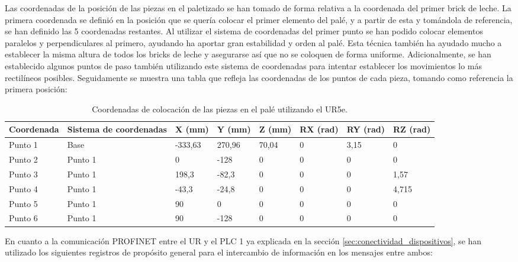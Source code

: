Las coordenadas de la posición de las piezas en el paletizado se han tomado de forma relativa a la coordenada del primer brick de leche. La primera coordenada se definió en la posición que se quería colocar el primer elemento del palé, y a partir de esta y tomándola de referencia, se han definido las 5 coordenadas restantes. Al utilizar el sistema de coordenadas del primer punto se han podido colocar elementos paralelos y perpendiculares al primero, ayudando ha aportar gran estabilidad y orden al palé. Esta técnica también ha ayudado mucho a establecer la misma altura de todos los bricks de leche y asegurarse así que no se coloquen de forma uniforme. Adicionalmente, se han establecido algunos puntos de paso también utilizando este sistema de coordenadas para intentar establecer los movimientos lo más rectilíneos posibles. Seguidamente se muestra una tabla que refleja las coordenadas de los puntos de cada pieza, tomando como referencia la primera posición:

\begin{table}[H]
\begin{center}

\renewcommand{\arraystretch}{1.5}
\begin{tabular}{|M{2.45cm}|M{2.7cm}|M{1.35cm}|M{1.35cm}|M{1.35cm}|M{1.2cm}|M{1.2cm}|M{1.2cm}|}
\hline
\textbf{Coordenada} &
\textbf{Sistema de coordenadas} & 
\textbf{X (mm)} & 
\textbf{Y (mm)} & 
\textbf{Z (mm)} &
\textbf{RX (rad)} &
\textbf{RY (rad)} &
\textbf{RZ (rad)} \\
\hline
Punto 1  & Base &  -333,63 & 270,96 & 70,04 & 0 & 3,15 & 0 \\
\hline
Punto 2  & Punto 1 &  0 & -128 & 0 & 0 & 0 & 0 \\
\hline
Punto 3  & Punto 1 &  198,3 & -82,3 & 0 & 0 & 0 & 1,57 \\
\hline
Punto 4  & Punto 1 &  -43,3 & -24,8 & 0 & 0 & 0 & 4,715 \\
\hline
Punto 5  & Punto 1 &  90 & 0 & 0 & 0 & 0 & 0 \\
\hline
Punto 6  & Punto 1 &  90 & -128 & 0 & 0 & 0 & 0 \\
\hline
\end{tabular}

\caption{\centering Coordenadas de colocación de las piezas en el palé utilizando el UR5e.}
\label{cuadro:coordenadas}
\end{center}
\end{table}

En cuanto a la comunicación PROFINET entre el UR y el PLC 1 ya explicada en la sección \ref{sec:conectividad_dispositivos}, se han utilizado los siguientes registros de propósito general para el intercambio de información en los mensajes entre ambos:

